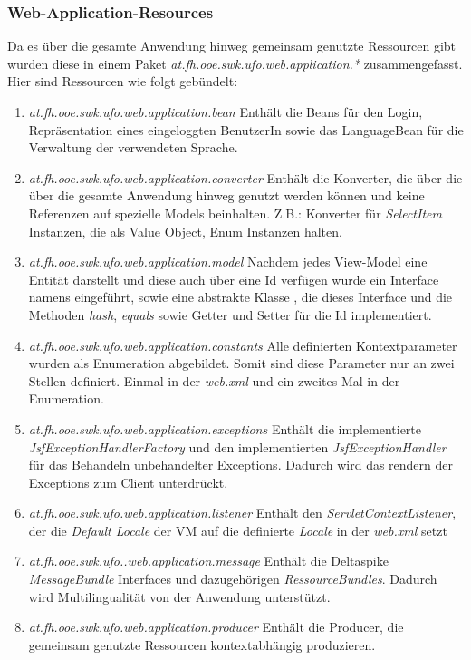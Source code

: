 \documentclass[11pt, a4paper, twoside]{article}   	%
\begin{document}
\subsubsection{Web-Application-Resources}
Da es über die gesamte Anwendung hinweg gemeinsam genutzte Ressourcen gibt wurden diese in einem Paket \emph{at.fh.ooe.swk.ufo.web.application.*} zusammengefasst. Hier sind Ressourcen wie folgt gebündelt:
\begin{enumerate}
	\item\emph{at.fh.ooe.swk.ufo.web.application.bean}
	\newline
	Enthält die Beans für den Login, Repräsentation eines eingeloggten BenutzerIn sowie das LanguageBean für die Verwaltung der verwendeten Sprache.
	\item\emph{at.fh.ooe.swk.ufo.web.application.converter}
	\newline
	Enthält die Konverter, die über die über die gesamte Anwendung hinweg genutzt werden können und keine Referenzen auf spezielle Models beinhalten. Z.B.: Konverter für \emph{SelectItem} Instanzen, die als Value Object, Enum Instanzen halten.
	\item\emph{at.fh.ooe.swk.ufo.web.application.model}
	\newline
	Nachdem jedes View-Model eine Entität darstellt und diese auch über eine Id verfügen wurde ein Interface namens  eingeführt, sowie eine abstrakte Klasse
	\newline {}, die dieses Interface und die Methoden \emph{hash}, \emph{equals} sowie Getter und Setter für die Id implementiert.
	\item\emph{at.fh.ooe.swk.ufo.web.application.constants}
	\newline
	Alle definierten Kontextparameter wurden als Enumeration abgebildet. Somit sind diese Parameter nur an zwei Stellen definiert. Einmal in der \emph{web.xml} und ein zweites Mal in der Enumeration.
	\item\emph{at.fh.ooe.swk.ufo.web.application.exceptions}
	\newline
	Enthält die implementierte \emph{JsfExceptionHandlerFactory} und den implementierten \emph{JsfExceptionHandler} für das Behandeln unbehandelter Exceptions. Dadurch wird das rendern der Exceptions zum Client unterdrückt.
	\item\emph{at.fh.ooe.swk.ufo.web.application.listener}
	\newline
	Enthält den \emph{ServletContextListener}, der die \emph{Default Locale} der VM auf die definierte \emph{Locale} in der \emph{web.xml} setzt
	\item\emph{at.fh.ooe.swk.ufo..web.application.message}
	\newline
	Enthält die Deltaspike \emph{MessageBundle} Interfaces und dazugehörigen \emph{RessourceBundles}. Dadurch wird Multilingualität von der Anwendung unterstützt.
	\item\emph{at.fh.ooe.swk.ufo.web.application.producer}
	\newline
	Enthält die Producer, die gemeinsam genutzte Ressourcen kontextabhängig produzieren.
\end{enumerate}  
\end{document}
